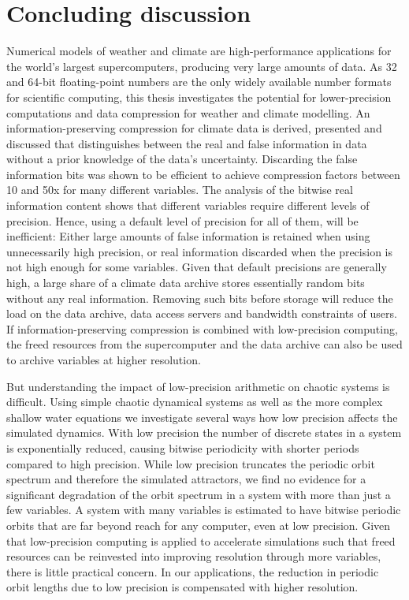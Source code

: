 \chapter{Concluding discussion}
\label{chap:conclusions}

Numerical models of weather and climate are high-performance applications for the world's largest supercomputers, producing very large amounts of data. 
As 32 and 64-bit floating-point numbers are the only widely available number formats for scientific computing, this thesis investigates the potential
for lower-precision computations and data compression for weather and climate modelling. An information-preserving compression for climate data
is derived, presented and discussed that distinguishes between the real and false information in data without a prior knowledge of the data's uncertainty.
Discarding the false information bits was shown to be efficient to achieve compression factors between 10 and 50x for many different variables. 
The analysis of the bitwise real information content shows that different variables require different levels of precision.
Hence, using a default level of precision for all of them, will be inefficient: Either large amounts of false information is retained when using unnecessarily
high precision, or real information discarded when the precision is not high enough for some variables. Given that default precisions are generally high,
a large share of a climate data archive stores essentially random bits without any real information. Removing such bits before storage will reduce
the load on the data archive, data access servers and bandwidth constraints of users. If information-preserving compression is combined
with low-precision computing, the freed resources from the supercomputer and the data archive can also be used to archive variables at
higher resolution.

But understanding the impact of low-precision arithmetic on chaotic systems is difficult. Using simple chaotic dynamical systems as well as the more
complex shallow water equations we investigate several ways how low precision affects the simulated dynamics. With low precision the number of
discrete states in a system is exponentially reduced, causing bitwise periodicity with shorter periods compared to high precision. While low precision
truncates the periodic orbit spectrum and therefore the simulated attractors, we find no evidence for a significant degradation of the orbit spectrum in
a system with more than just a few variables. A system with many variables is estimated to have bitwise periodic orbits that are far beyond reach for
any computer, even at low precision. Given that low-precision computing is applied to accelerate simulations such that freed resources can be
reinvested into improving resolution through more variables, there is little practical concern. In our applications, the reduction in periodic orbit lengths
due to low precision is compensated with higher resolution. 

